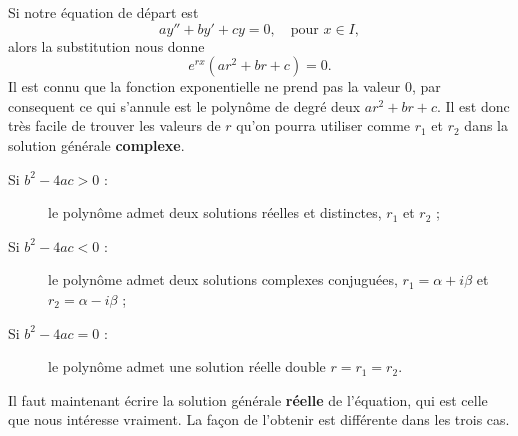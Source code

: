 Si notre équation de départ est
\begin{equation}\label{eq_lin_ordre_deux_hom}
  ay'' + by' + cy = 0, \quad\text{pour } x\in I,
\end{equation}
alors la substitution nous donne
\[
e^{rx}\left(ar^2+br+c\right)=0.
\]
Il est connu que la fonction exponentielle ne prend pas la valeur $0$, par consequent ce qui s'annule est le polynôme de degré deux $ar^2+br+c$. Il est donc très facile de trouver les valeurs de $r$ qu'on pourra utiliser comme $r_1$ et $r_2$ dans la solution générale \textbf{complexe}.
\begin{description}
  \item[Si $b^2 - 4ac >0$ :] le polynôme admet deux solutions réelles et distinctes, $r_1$ et $r_2$ ;
  \item[Si $b^2 - 4ac <0$ :] le polynôme admet deux solutions complexes conjuguées, $r_1 = \alpha + i \beta$ et $r_2 = \alpha - i \beta$ ;
  \item[Si $b^2 - 4ac =0$ :] le polynôme admet une solution réelle double $r=r_1 = r_2$.
\end{description}
Il faut maintenant écrire la solution générale \textbf{réelle} de l'équation, qui est celle que nous intéresse vraiment. La façon de l'obtenir est différente dans les trois cas.
